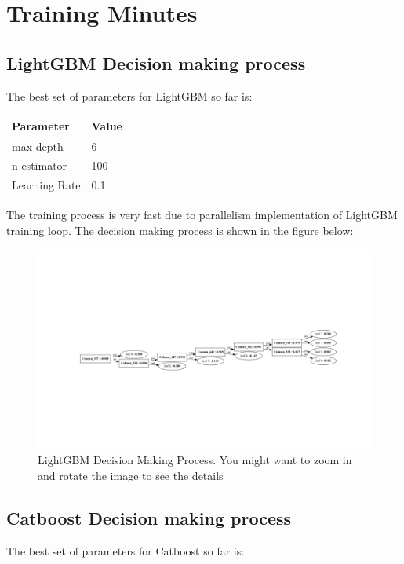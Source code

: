 \documentclass[10pt,letterpaper]{article}
\begin{document}
\section{Training Minutes}
\subsection{LightGBM Decision making process}
The best set of parameters for LightGBM so far is:
\begin{table}[H]
    \centering
    \begin{tabular}{ll}
    \textbf{Parameter} & \textbf{Value} \\
    \hline
    max-depth & 6 \\
    n-estimator & 100 \\
    Learning Rate & 0.1 \\
    \end{tabular}
    \end{table}
The training process is very fast due to parallelism implementation of LightGBM training loop. The decision making process is shown in the figure below:

\newpage
\begin{figure}[H]
    \centering
    \includegraphics[width=\paperwidth, angle=270]{plots/lgbm_tree.pdf}
    \caption{LightGBM Decision Making Process. You might want to zoom in and rotate the image to see the details}
    \label{fig:catboost-decision}
\end{figure}

\subsection{Catboost Decision making process}
The best set of parameters for Catboost so far is:
\end{document}
